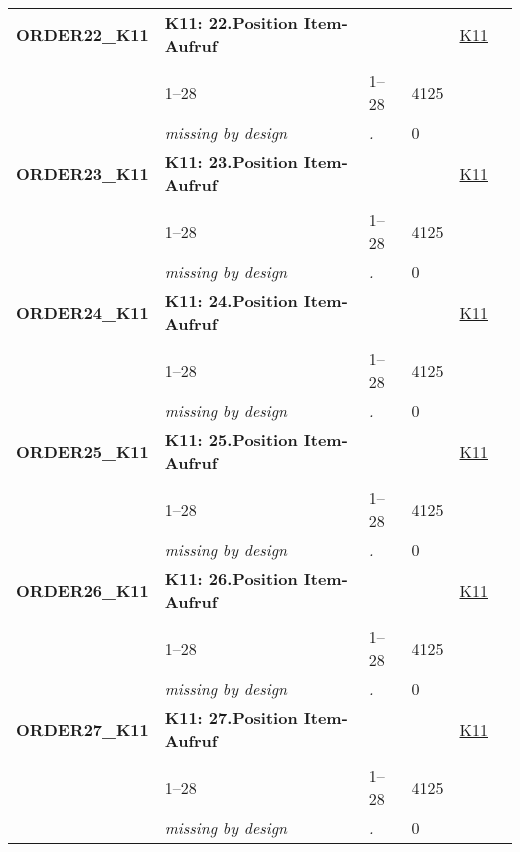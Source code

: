 \begin{longtable}{| L{2.45cm} | L{6cm} | C{1.5cm} | R{1cm} | C{2.25cm} | C{2.25cm} |}
   \midrule
\textbf{ORDER22\_K11}\label{var:ORDER22:K11} & \textbf{K11: 22.Position Item-Aufruf} &  &  & \hyperref[K11]{K11} & \hyperref[var:suf:]{} \\ 
   &  &  &  &  &  \\ 
   & 1--28 & 1--28 & 4125 &  &  \\ 
   & \textit{missing by design} & \textit{.} & 0 &  &  \\ 
   \midrule
\textbf{ORDER23\_K11}\label{var:ORDER23:K11} & \textbf{K11: 23.Position Item-Aufruf} &  &  & \hyperref[K11]{K11} & \hyperref[var:suf:]{} \\ 
   &  &  &  &  &  \\ 
   & 1--28 & 1--28 & 4125 &  &  \\ 
   & \textit{missing by design} & \textit{.} & 0 &  &  \\ 
   \midrule
\textbf{ORDER24\_K11}\label{var:ORDER24:K11} & \textbf{K11: 24.Position Item-Aufruf} &  &  & \hyperref[K11]{K11} & \hyperref[var:suf:]{} \\ 
   &  &  &  &  &  \\ 
   & 1--28 & 1--28 & 4125 &  &  \\ 
   & \textit{missing by design} & \textit{.} & 0 &  &  \\ 
   \midrule
\textbf{ORDER25\_K11}\label{var:ORDER25:K11} & \textbf{K11: 25.Position Item-Aufruf} &  &  & \hyperref[K11]{K11} & \hyperref[var:suf:]{} \\ 
   &  &  &  &  &  \\ 
   & 1--28 & 1--28 & 4125 &  &  \\ 
   & \textit{missing by design} & \textit{.} & 0 &  &  \\ 
   \midrule
\textbf{ORDER26\_K11}\label{var:ORDER26:K11} & \textbf{K11: 26.Position Item-Aufruf} &  &  & \hyperref[K11]{K11} & \hyperref[var:suf:]{} \\ 
   &  &  &  &  &  \\ 
   & 1--28 & 1--28 & 4125 &  &  \\ 
   & \textit{missing by design} & \textit{.} & 0 &  &  \\ 
   \midrule
\textbf{ORDER27\_K11}\label{var:ORDER27:K11} & \textbf{K11: 27.Position Item-Aufruf} &  &  & \hyperref[K11]{K11} & \hyperref[var:suf:]{} \\ 
   &  &  &  &  &  \\ 
   & 1--28 & 1--28 & 4125 &  &  \\ 
   & \textit{missing by design} & \textit{.} & 0 &  &  \\ 

\end{longtable}
